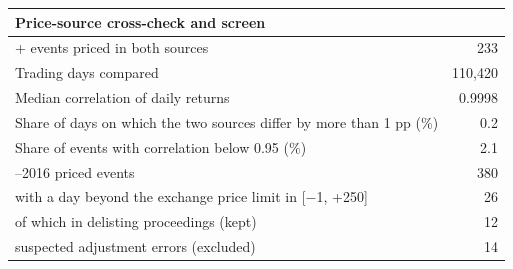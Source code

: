 \begin{tabular}{>{\raggedright\arraybackslash}p{11cm}r}
\toprule
Price-source cross-check and screen & \\
\midrule
2017+ events priced in both sources & 233 \\
Trading days compared & 110,420 \\
Median correlation of daily returns & 0.9998 \\
Share of days on which the two sources differ by more than 1 pp (\%) & 0.2 \\
Share of events with correlation below 0.95 (\%) & 2.1 \\
\midrule
2001--2016 priced events & 380 \\
\quad with a day beyond the exchange price limit in [$-$1, +250] & 26 \\
\quad of which in delisting proceedings (kept) & 12 \\
\quad suspected adjustment errors (excluded) & 14 \\
\bottomrule
\end{tabular}

